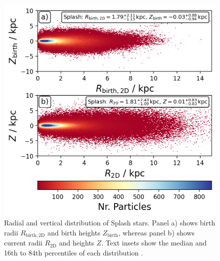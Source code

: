 \documentclass[fleqn,usenatbib]{mnras}
\begin{document}
\begin{figure}
    \centering
    \includegraphics[width=\columnwidth]{figures/splash_rz_birth_now.png}
    \caption{Radial and vertical distribution of Splash stars. Panel a) shows birth radii $R_\mathrm{birth, 2D}$ and birth heights $Z_\mathrm{birth}$, whereas panel b) shows current radii $R_\mathrm{2D}$ and heights $Z$. Text insets show the median and 16th to 84th percentiles of each distribution
    \href{https://github.com/svenbuder/golden_thread_II/tree/main/figures}{\faGithub}.}
    \label{fig:splash_rz_birth_now}
\end{figure}
\end{document}
